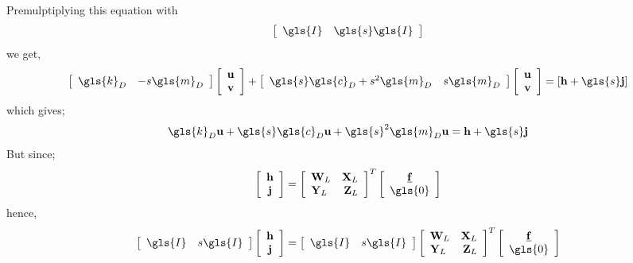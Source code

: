 Premulptiplying this equation with \begin{align} \left[\begin{array}{lr}\gls{I} & \gls{s} \gls{I}\end{array}\right] \end{align}
we get,
\begin{align}
\left[\begin{array}{lr}\gls{k}_D & -s\gls{m}_D\end{array}\right]\left[\begin{array}{c}\mathbf{u}\\\mathbf{v}\end{array}\right] + \left[\begin{array}{lr}\gls{s}\gls{c}_D + s^2\gls{m}_D & s\gls{m}_D\end{array}\right]\left[\begin{array}{c}\mathbf{u}\\\mathbf{v}\end{array}\right] = \left[\mathbf{h} + \gls{s}\mathbf{j}\right]
\end{align}
\thispagestyle{empty}
which gives;
\begin{align}
\gls{k}_D \mathbf{u} + \gls{s}\gls{c}_D\mathbf{u} + \gls{s}^2 \gls{m}_D \mathbf{u} = \mathbf{h} + \gls{s}\mathbf{j}
\end{align}
But since;
\begin{align}
\left[\begin{array}{c}\mathbf{h}\\\mathbf{j}\end{array}\right] = {\mat{\mathbf{W}_L}{\mathbf{X}_L}{\mathbf{Y}_L}{\mathbf{Z}_L}}^T \left[\begin{array}{c}\underline{\mathbf{f}}\\\gls{0}\end{array}\right]
\end{align}
hence,
\begin{align}\left[\begin{array}{lr}\gls{I} & s\gls{I}\end{array}\right]
\left[\begin{array}{c}\mathbf{h}\\\mathbf{j}\end{array}\right] = \left[\begin{array}{lr}\gls{I} & s\gls{I}\end{array}\right]{\mat{\mathbf{W}_L}{\mathbf{X}_L}{\mathbf{Y}_L}{\mathbf{Z}_L}}^T \left[\begin{array}{c}\underline{\mathbf{f}}\\\gls{0}\end{array}\right]
\end{align}
